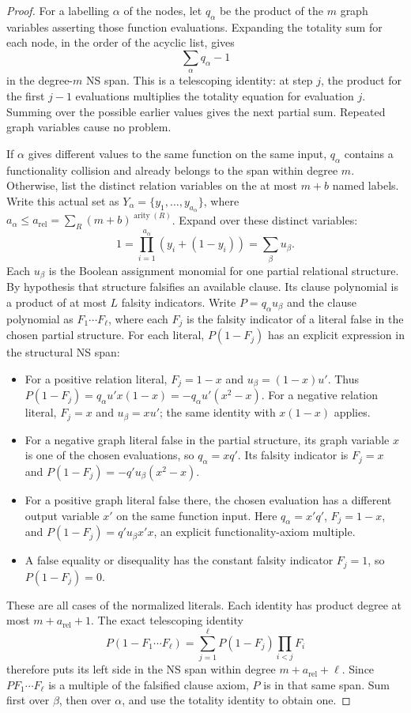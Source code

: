 \begin{proof}
For a labelling $\alpha$ of the nodes, let $q_\alpha$ be the product of the
$m$ graph variables asserting those function evaluations. Expanding the
totality sum for each node, in the order of the acyclic list, gives
\[
                         \sum_\alpha q_\alpha-1
\]
in the degree-$m$ NS span. This is a telescoping identity: at step $j$, the
product for the first $j-1$ evaluations multiplies the totality equation
for evaluation $j$. Summing over the possible earlier values gives the
next partial sum. Repeated graph variables cause no problem.

If $\alpha$ gives different values to the same function on the same input,
$q_\alpha$ contains a functionality collision and already belongs to the
span within degree $m$. Otherwise, list the distinct relation variables
on the at most $m+b$ named labels. Write this actual set as
$Y_\alpha=\{y_1,\ldots,y_{a_\alpha}\}$, where
$a_\alpha\leq a_{\mathrm{rel}}=\sum_R(m+b)^{\operatorname{arity}(R)}$.
Expand over these distinct variables:
\[
             1=\prod_{i=1}^{a_\alpha}(y_i+(1-y_i))
              =\sum_\beta u_\beta.
\]
Each $u_\beta$ is the Boolean assignment monomial for one partial relational
structure. By hypothesis that structure falsifies an available clause.
Its clause polynomial is a product of at most $L$ falsity indicators.
Write $P=q_\alpha u_\beta$ and the clause polynomial as
$F_1\cdots F_\ell$, where each $F_j$ is the falsity indicator of a
literal false in the chosen partial structure. For each literal,
$P(1-F_j)$ has an explicit expression in the structural NS span:
\begin{itemize}
\item For a positive relation literal, $F_j=1-x$ and $u_\beta=(1-x)u'$.
Thus $P(1-F_j)=q_\alpha u'x(1-x)=-q_\alpha u'(x^2-x)$.
For a negative relation literal, $F_j=x$ and $u_\beta=xu'$; the same
identity with $x(1-x)$ applies.
\item For a negative graph literal false in the partial structure,
its graph variable $x$ is one of the chosen evaluations, so
$q_\alpha=xq'$. Its falsity indicator is $F_j=x$ and
$P(1-F_j)=-q'u_\beta(x^2-x)$.
\item For a positive graph literal false there, the chosen evaluation
has a different output variable $x'$ on the same function input.
Here $q_\alpha=x'q'$, $F_j=1-x$, and
$P(1-F_j)=q'u_\beta x'x$, an explicit functionality-axiom multiple.
\item A false equality or disequality has the constant falsity
indicator $F_j=1$, so $P(1-F_j)=0$.
\end{itemize}
These are all cases of the normalized literals. Each identity has
product degree at most $m+a_{\mathrm{rel}}+1$.
The exact telescoping identity
\[
 P(1-F_1\cdots F_\ell)
   =\sum_{j=1}^{\ell}P(1-F_j)\prod_{i<j}F_i
\]
therefore puts its left side in the NS span within degree
$m+a_{\mathrm{rel}}+\ell$. Since $PF_1\cdots F_\ell$ is a
multiple of the falsified clause axiom, $P$ is in that same span.
Sum first over $\beta$, then over $\alpha$, and use the totality identity
to obtain one.
\end{proof}


